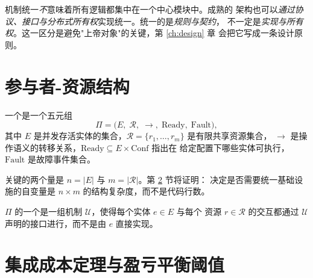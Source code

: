 机制统一\emph{不}意味着所有逻辑都集中在一个中心模块中。成熟的
架构也可以\emph{通过协议、接口与分布式所有权}实现统一。统一的是\emph{规则与契约}，
不一定是\emph{实现与所有权}。这一区分是避免"上帝对象"的关键，第 \ref{ch:design} 章
会把它写成一条设计原则。

\section{参与者-资源结构}\label{sec:participant}

\begin{definition}\label{def:pr-structure}
一个是一个五元组
\begin{equation}\label{eq:pr}
\Pi = \bigl(E,\; \mathcal{R},\; \to,\; \mathrm{Ready},\; \mathrm{Fault}\bigr),
\end{equation}
其中 $E$ 是并发存活实体的集合，$\mathcal{R} = \{r_1,\dots,r_m\}$ 是有限共享资源集合，
$\to$ 是操作语义的转移关系，$\mathrm{Ready} \subseteq E \times \mathrm{Conf}$ 指出在
给定配置下哪些实体可执行，$\mathrm{Fault}$ 是故障事件集合。
\end{definition}

关键的两个量是 $n = |E|$ 与 $m = |\mathcal{R}|$。第 \ref{sec:integration} 节将证明：
决定是否需要统一基础设施的自变量是 $n \times m$ 的结构复杂度，而不是代码行数。

\begin{definition}[统一基座]\label{def:substrate}
$\Pi$ 的一个是一组机制 $\mathcal{U}$，使得每个实体 $e \in E$ 与每个
资源 $r \in \mathcal{R}$ 的交互都通过 $\mathcal{U}$ 声明的接口进行，而不是由 $e$
直接实现。
\end{definition}

\section{集成成本定理与盈亏平衡阈值}\label{sec:integration}

